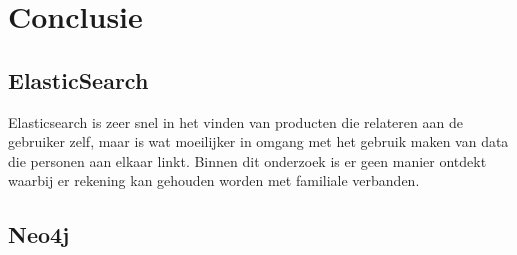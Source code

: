 
\chapter{Conclusie}
\label{ch:conclusie}


\section{ ElasticSearch}
\label{sec:Conclusie Elasticsearch}

Elasticsearch is zeer snel in het vinden van producten die relateren aan de gebruiker zelf, maar is wat moeilijker in omgang met het gebruik maken van data die personen aan elkaar linkt. Binnen dit onderzoek is er geen manier ontdekt waarbij er rekening kan gehouden worden met familiale verbanden. 


\section{ Neo4j}
\label{sec:Conclusie Neo4j}